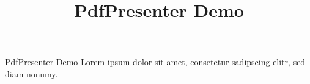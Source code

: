 \documentclass{beamer}
\title{PdfPresenter Demo}
\begin{document}
\begin{frame}{PdfPresenter Demo}
Lorem ipsum dolor sit amet, consetetur sadipscing elitr, sed diam nonumy.
\end{frame}
\end{document}
